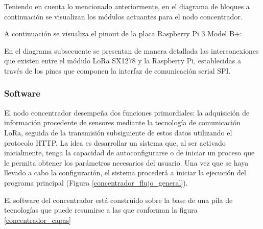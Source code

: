 Teniendo en cuenta lo mencionado anteriormente, en el diagrama de bloques a continuación se visualizan los módulos actuantes para el nodo concentrador.



A continuación se visualiza el pinout de la placa Raspberry Pi 3 Model B+:



En el diagrama subsecuente se presentan de manera detallada las interconexiones que existen entre el módulo LoRa SX1278 y la Raspberry Pi, establecidas a través de los pines que componen la interfaz de comunicación serial SPI.




\subsubsection{Software}
El nodo concentrador desempeña dos funciones primordiales: la adquisición de información procedente de sensores mediante la tecnología de comunicación LoRa, seguida de la transmisión subsiguiente de estos datos utilizando el protocolo HTTP.
La idea es desarrollar un sistema que, al ser activado inicialmente, tenga la capacidad de autoconfigurarse o de iniciar un proceso que le permita obtener los parámetros necesarios del usuario. Una vez que se haya llevado a cabo la configuración, el sistema procederá a iniciar la ejecución del programa principal (Figura \ref{concentrador_flujo_general}).



El software del concentrador está construido sobre la base de una pila de tecnologías que puede resumirse a las que conforman la figura \ref{concentrador_capas}


